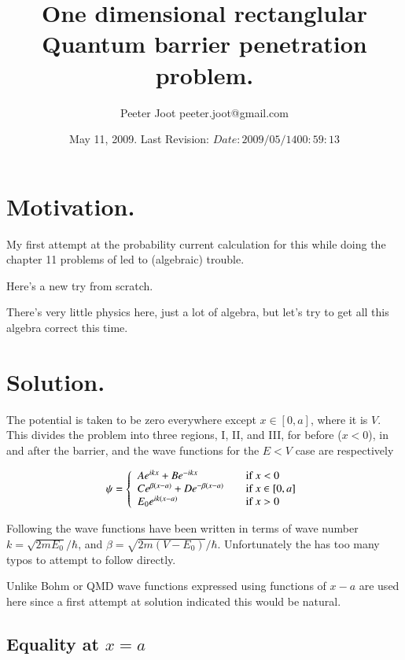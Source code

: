 \documentclass{article}
\title{ One dimensional rectanglular Quantum barrier penetration problem. }
\author{Peeter Joot \quad peeter.joot@gmail.com }
\date{ May 11, 2009.  Last Revision: $Date: 2009/05/14 00:59:13 $ }
\begin{document}
\maketitle{}
\tableofcontents
\section{ Motivation. }

My first attempt at the probability current calculation for this
while doing the chapter 11 problems of \cite{bohm1989qt} led to (algebraic) trouble.

Here's a new try from scratch.

There's very little physics here, just a lot of algebra, but let's try
to get all this algebra correct this time.

\section{ Solution. }

The potential is taken to be zero everywhere except $x \in [0,a]$, where it is
$V$.  This divides the problem into three regions, I, II, and III, for 
before ($x<0$), in and after the barrier, and the wave functions for the 
$E <V$ case are respectively

\begin{equation}
\psi =
\left\{
\begin{array}{l l}
A e^{i k x} + B e^{-i k x} & \quad \mbox{if $x <0$} \\
C e^{ \beta(x-a)} + D e^{ -\beta(x-a)} & \quad \mbox{if $x \in [0,a]$} \\
E_0 e^{i k(x-a)} & \quad \mbox{if $x >0$} \\
\end{array}
\right.
\end{equation}

Following \cite{mcmahon2005qmd} the wave functions have been written in terms of wave number 
$k = \sqrt{2 m E_0}/\hbar$, and $\beta = \sqrt{2 m (V-E_0)}/\hbar$.  Unfortunately the 
\cite{mcmahon2005qmd} has too many typos to attempt to follow directly.

Unlike Bohm or QMD wave functions expressed using functions of $x-a$ are used here since a first
attempt at solution indicated this would be natural.

\subsection{ Equality at $x=a$ }
\end{document}

